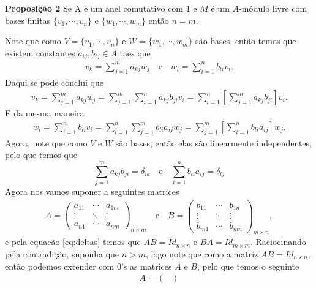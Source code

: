 \begin{homeworkProblem}
  \textbf{Proposição 2} Se A é um anel comutativo com $1$ e $M$ é um $A$-módulo livre com bases finitas $\{v_1,\cdots, v_n\}$ e $\{w_1,\cdots,w_m\}$ então $n=m$.
  \begin{solution}
    Note que como $V=\{v_1,\cdots,v_n\}$ e $W=\{w_1,\cdots,w_m\}$ são bases, então temos que existem constantes $a_{ij},b_{ij}\in A$ taes que
\begin{align*}
  v_k=\sum_{j=1}^{m}a_{kj}w_{j}\quad\text{e}\quad w_l=\sum_{i=1}^{n}b_{li}v_{i}.
\end{align*}
Daqui se pode conclui que
\begin{align*}
  v_k=\sum_{j=1}^{m}a_{kj}w_j=\sum_{j=1}^{m}\sum_{i=1}^{n}a_{kj}b_{ji}v_{i}=\sum_{i=1}^{n}\left[\sum_{j=1}^{m}a_{kj}b_{ji}\right]v_{i}.
\end{align*}
E da mesma maneira
\begin{align*}
  w_l=\sum_{i=1}^{n}b_{li}v_i=\sum_{i=1}^{n}\sum_{j=1}^{m}b_{li}a_{ij}w_{j}=\sum_{j=1}^{m}\left[\sum_{i=1}^{n}b_{li}a_{ij}\right]w_{j}.
\end{align*}
Agora, note que como $V$ e $W$ são bases, então elas são linearmente independentes, pelo que temos que
\begin{equation}\label{eq:deltas}
  \sum_{j=1}^{m}a_{kj}b_{ji}=\delta_{ik}\quad\text{e}\quad\sum_{i=1}^{n}b_{li}a_{ij}=\delta_{lj}
\end{equation}
Agora nos vamos suponer a seguintes matrices
\begin{align*}
  A=\begin{pmatrix}
    a_{11} & \cdots & a_{1m}\\
    \vdots & \ddots & \vdots\\
    a_{n1} & \cdots & a_{nm}
  \end{pmatrix}_{n\times m}\quad\text{e}\quad B=\begin{pmatrix}
    b_{11} & \cdots & b_{1n}\\
    \vdots & \ddots & \vdots\\
    b_{m1} & \cdots & b_{mn}
  \end{pmatrix}_{m\times n},
\end{align*}
e pela equacão \eqref{eq:deltas} temos que $AB=Id_{n\times n}$ e $BA=Id_{m\times m}$. Raciocinando pela contradição, suponha que $n>m$, logo note que como a matriz $AB=Id_{n\times n}$, então podemos extender com $0$'s as matrices $A$ e $B$, pelo que temos o seguinte
\begin{align*}
  A=\begin{pmatrix}

\end{pmatrix}
\end{align*}
\end{solution}
\end{homeworkProblem}
